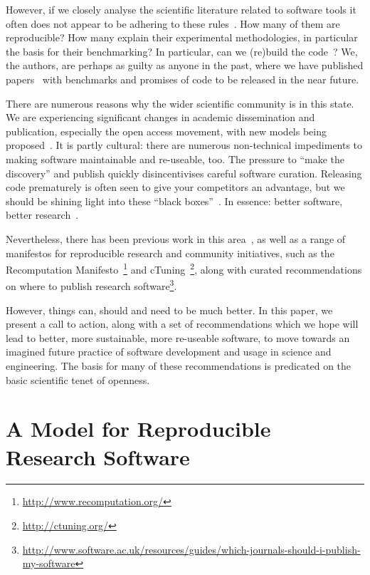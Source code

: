 \documentclass[a4paper,11pt]{article}
\begin{document}
However, if we closely analyse the scientific literature related to
software tools it often does not appear to be adhering to these
rules~\cite{nature:2011}. How many of them are reproducible? How many
explain their experimental methodologies, in particular the basis for
their benchmarking? In particular, can we (re)build the
code~\cite{collberg-et-al:2014}? We, the authors, are perhaps as
guilty as anyone in the past, where we have published
papers~\cite{crick-et-al:2009a,Berdine2011SLAyer} with benchmarks and
promises of code to be released in the near future.

There are numerous reasons why the wider scientific community is in
this state. We are experiencing significant changes in academic
dissemination and publication, especially the open access movement,
with new models being
proposed~\cite{stodden-et-al:2013,fursin+dubach:2014}. It is partly
cultural: there are numerous non-technical impediments to making
software maintainable and re-useable, too. The pressure to ``make the
discovery'' and publish quickly disincentivises careful software
curation. Releasing code prematurely is often seen to give your
competitors an advantage, but we should be shining light into these
``black boxes''~\cite{morin-et-al:2012}. In essence: better software,
better research~\cite{goble:2014}.

Nevertheless, there has been previous work in this
area~\cite{sim-et-al:2003,chirigati-et-al:2013}, as well as a range of
manifestos for reproducible research and community initiatives, such
as the Recomputation
Manifesto~\cite{gent:2013}\footnote{\url{http://www.recomputation.org/}}
and
cTuning~\cite{fursin-et-al:2014}\footnote{\url{http://ctuning.org/}},
along with curated recommendations on where to publish research
software\footnote{\url{http://www.software.ac.uk/resources/guides/which-journals-should-i-publish-my-software}}.

However, things can, should and need to be much better. In this paper,
we present a call to action, along with a set of recommendations which
we hope will lead to better, more sustainable, more re-useable
software, to move towards an imagined future practice of software
development and usage in science and engineering.  The basis for many
of these recommendations is predicated on the basic scientific tenet
of openness.

\section{A Model for Reproducible Research Software}
\end{document}
